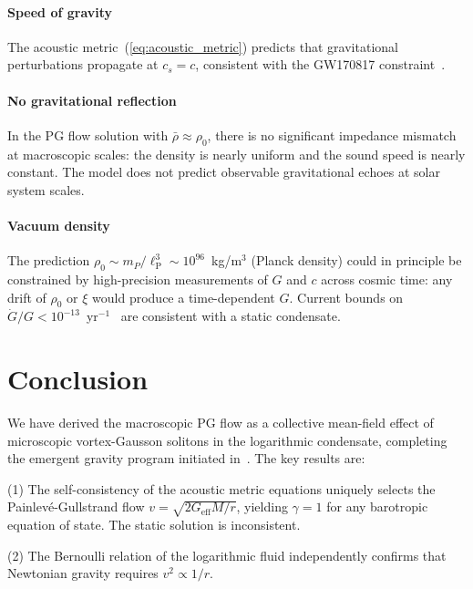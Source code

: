 \documentclass[12pt, a4paper]{article}
\newcommand{\Geff}{G_{\mathrm{eff}}}
\newcommand{\rhob}{\bar{\rho}}
\newcommand{\lP}{\ell_{\mathrm{P}}}
\begin{document}
\paragraph{Speed of gravity} The acoustic metric~(\ref{eq:acoustic_metric}) predicts that gravitational perturbations propagate at $c_s = c$, consistent with the GW170817 constraint~\cite{abbott_2017}.

\paragraph{No gravitational reflection} In the PG flow solution with $\rhob \approx \rho_0$, there is no significant impedance mismatch at macroscopic scales: the density is nearly uniform and the sound speed is nearly constant. The model does not predict observable gravitational echoes at solar system scales.

\paragraph{Vacuum density} The prediction $\rho_0 \sim m_P/\lP^3 \sim 10^{96}$~kg/m$^3$ (Planck density) could in principle be constrained by high-precision measurements of $G$ and $c$ across cosmic time: any drift of $\rho_0$ or $\xi$ would produce a time-dependent $G$. Current bounds on $\dot G/G < 10^{-13}$~yr$^{-1}$~\cite{will_2014} are consistent with a static condensate.


\newpage
\section{Conclusion}
\label{sec:conclusion}

We have derived the macroscopic PG flow as a collective
mean-field effect of microscopic vortex-Gausson solitons in the logarithmic condensate, completing the emergent gravity program initiated in~\cite{kulangiev_2026}. The key results are:

(1) The self-consistency of the acoustic metric equations uniquely selects the Painlev\'{e}-Gullstrand flow $v = \sqrt{2\Geff M/r}$, yielding $\gamma = 1$ for any barotropic equation of state. The static solution is inconsistent.

(2) The Bernoulli relation of the logarithmic fluid
independently confirms that Newtonian gravity requires
$v^2 \propto 1/r$.
\end{document}
